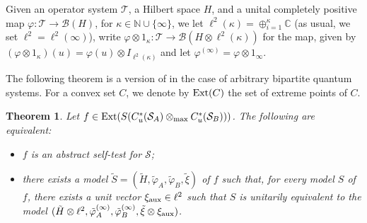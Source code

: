\documentclass[11pt]{amsart}
\newtheorem{theorem}{Theorem}[section]
\theoremstyle{definition}
\newcommand\nph{\varphi}
\newcommand{\cl}[1]{\mathcal{#1}}
\newcommand{\bb}[1]{\mathbb{#1}}
\begin{document}
Given an operator system $\cl T$, a Hilbert space $H$, and a 
unital completely positive map $\nph : \cl T\to \cl B(H)$,
for $\kappa\in \bb{N}\cup \{\infty\}$, we let 
$\ell^2(\kappa) = \oplus_{i=1}^{\kappa} \bb{C}$ 
(as usual, we set $\ell^2 = \ell^2(\infty)$), 
write
$\nph\otimes 1_{\kappa} : \cl T\to \cl B(H\otimes \ell^2(\kappa))$
for the map, given by $(\nph\otimes 1_{\kappa})(u) = \nph(u)\otimes I_{\ell^2(\kappa)}$ and let
$\nph^{(\infty)} = \nph\otimes 1_{\infty}$. 


The following theorem is a version of \cite[Theorem 7.5]{pszz} in 
the case of arbitrary bipartite quantum systems. 
For a convex set $C$, we denote by ${\rm Ext}(C)$ the 
set of extreme points of $C$.


\begin{theorem}\label{th_charallqc}
Let
$f\in {\rm Ext}(S(C^*_u(\cl S_A)\otimes_{\max} C^*_u(\cl S_B)))$. The following are equivalent: 
\begin{itemize}
\item[(i)] $f$ is an abstract self-test for $\cl S$;

\item[(ii)] there exists a model 
$\tilde{S} = (\tilde{H},\tilde{\nph}_A, \tilde{\nph}_B,\tilde{\xi})$
of $f$ such that, for every model $S$ of $f$, there exists a unit vector 
$\xi_{\rm aux}\in \ell^2$ such that $S$ is unitarily equivalent to the model
$(\tilde{H}\otimes\ell^2,\tilde{\nph}_A^{(\infty)}, \tilde{\nph}_B^{(\infty)},
\tilde{\xi}\otimes \xi_{\rm aux})$.
\end{itemize}
\end{theorem}
\end{document}
